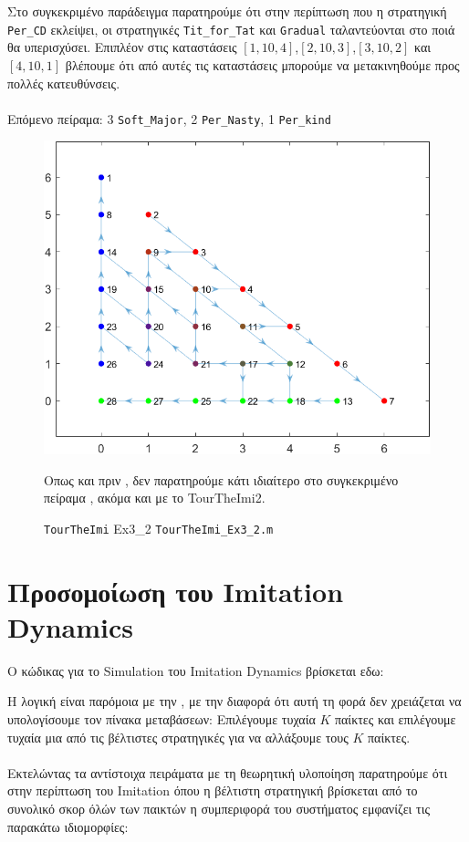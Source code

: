 Στο συγκεκριμένο παράδειγμα παρατηρούμε ότι στην περίπτωση που η στρατηγική \texttt{ Per\_CD} εκλείψει, οι στρατηγικές \texttt{Tit\_for\_Tat} και \texttt{Gradual} ταλαντεύονται στο ποιά θα υπερισχύσει. Επιπλέον στις καταστάσεις \([1,10,4]\),\([2,10,3]\),\([3,10,2]\) και \([4,10,1]\) βλέπουμε ότι από αυτές τις καταστάσεις μπορούμε να μετακινηθούμε προς πολλές κατευθύνσεις.\\
\\
Επόμενο πείραμα: 3 \texttt{Soft\_Major}, 2 \texttt{Per\_Nasty}, 1 \texttt{Per\_kind}

\begin{figure}[th!]
	\centering
	\includegraphics[width=0.60\linewidth]{TourTheImi_Ex3_2}
	\caption{\texttt{TourTheImi} Ex3\_2 \texttt{TourTheImi\_Ex3\_2.m}}
	\label{fig:tourtheimiex32}
	\flushleft
	Οπως και πριν , δεν παρατηρούμε κάτι ιδιαίτερο στο συγκεκριμένο πείραμα , ακόμα και με το TourTheImi2.
\end{figure}







\section{Προσομοίωση του Imitation Dynamics}
Ο κώδικας για το Simulation του Imitation Dynamics βρίσκεται εδω:
    
Η λογική είναι παρόμοια με την , με την διαφορά ότι αυτή τη φορά δεν χρειάζεται να υπολογίσουμε τον πίνακα μεταβάσεων: Επιλέγουμε τυχαία \(Κ\) παίκτες και επιλέγουμε τυχαία μια από τις βέλτιστες στρατηγικές για να αλλάξουμε τους \( Κ\) παίκτες.
\\
\\
Εκτελώντας τα αντίστοιχα πειράματα με τη θεωρητική υλοποίηση παρατηρούμε ότι στην περίπτωση του Imitation όπου η βέλτιστη στρατηγική βρίσκεται από το συνολικό σκορ όλών των παικτών η συμπεριφορά του συστήματος εμφανίζει τις παρακάτω ιδιομορφίες:

